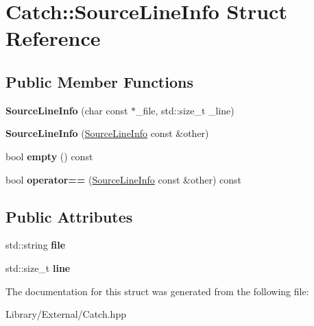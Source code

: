 \hypertarget{struct_catch_1_1_source_line_info}{}\section{Catch\+:\+:Source\+Line\+Info Struct Reference}
\label{struct_catch_1_1_source_line_info}
\subsection*{Public Member Functions}
\begin{DoxyCompactItemize}
\item 
\hypertarget{struct_catch_1_1_source_line_info_a6218cb890337d37f708ea94063958940}{}{\bfseries Source\+Line\+Info} (char const $\ast$\+\_\+file, std\+::size\+\_\+t \+\_\+line)\label{struct_catch_1_1_source_line_info_a6218cb890337d37f708ea94063958940}

\item 
\hypertarget{struct_catch_1_1_source_line_info_a1ec99cc0547ce5909133aaa8f14ed4b1}{}{\bfseries Source\+Line\+Info} (\hyperlink{struct_catch_1_1_source_line_info}{Source\+Line\+Info} const \&other)\label{struct_catch_1_1_source_line_info_a1ec99cc0547ce5909133aaa8f14ed4b1}

\item 
\hypertarget{struct_catch_1_1_source_line_info_a9a25ffc0640d1a3dd0c9b7e5fcbba7b9}{}bool {\bfseries empty} () const \label{struct_catch_1_1_source_line_info_a9a25ffc0640d1a3dd0c9b7e5fcbba7b9}

\item 
\hypertarget{struct_catch_1_1_source_line_info_af0854821b1abfda52796ef0f1294b050}{}bool {\bfseries operator==} (\hyperlink{struct_catch_1_1_source_line_info}{Source\+Line\+Info} const \&other) const \label{struct_catch_1_1_source_line_info_af0854821b1abfda52796ef0f1294b050}

\end{DoxyCompactItemize}
\subsection*{Public Attributes}
\begin{DoxyCompactItemize}
\item 
\hypertarget{struct_catch_1_1_source_line_info_adf3ccf0c2bd326eb3466318af82a94dd}{}std\+::string {\bfseries file}\label{struct_catch_1_1_source_line_info_adf3ccf0c2bd326eb3466318af82a94dd}

\item 
\hypertarget{struct_catch_1_1_source_line_info_a841e5d696c7b9cde24e45e61dd979c77}{}std\+::size\+\_\+t {\bfseries line}\label{struct_catch_1_1_source_line_info_a841e5d696c7b9cde24e45e61dd979c77}

\end{DoxyCompactItemize}


The documentation for this struct was generated from the following file\+:\begin{DoxyCompactItemize}
\item 
Library/\+External/Catch.\+hpp\end{DoxyCompactItemize}
